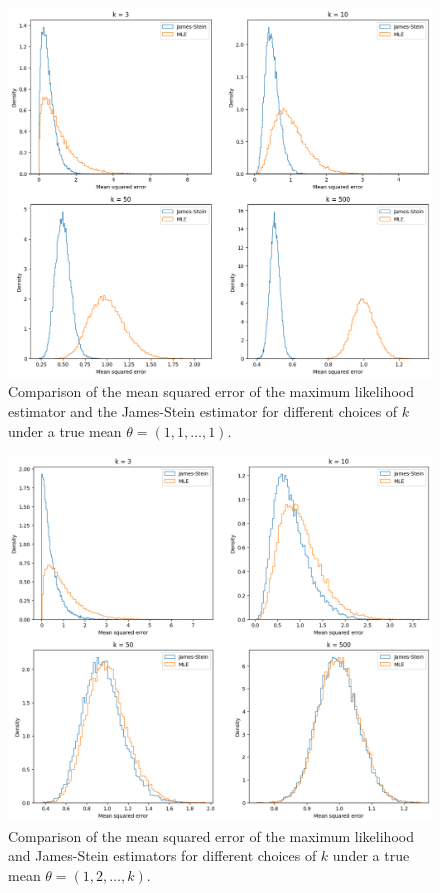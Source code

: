 \begin{ex}
  \inputminted{python}{../code/ex12_06.py}

  \begin{figure}[H]
    \centering
    \includegraphics[scale=0.545]{../images/12-06a}
    \caption{Comparison of the mean squared error of the maximum likelihood
      estimator and the James-Stein estimator for different choices of $k$ under
      a true mean $\theta=(1,1,\ldots,1)$.}
  \end{figure}

  \begin{figure}[H]
    \centering
    \includegraphics[scale=0.54]{../images/12-06b}
    \caption{Comparison of the mean squared error of the maximum likelihood
      and James-Stein estimators for different choices of $k$ under
      a true mean $\theta=(1,2,\ldots,k)$.}
  \end{figure}
\end{ex}
